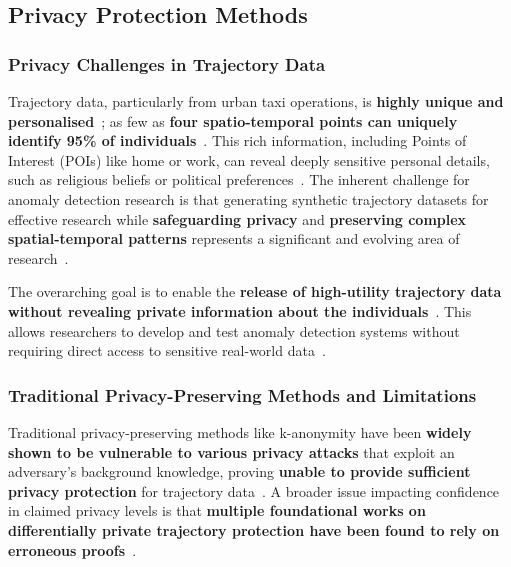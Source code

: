 \documentclass[runningheads]{llncs}
\begin{document}
\subsection{Privacy Protection Methods}
\label{sec:privacy-review}

\subsubsection{Privacy Challenges in Trajectory Data}

Trajectory data, particularly from urban taxi operations, is \textbf{highly unique and personalised}~\cite{Primault2019LongRoad,Buchholz2022RAoPT,Ma2021TrajectoryPrivacy}; as few as \textbf{four spatio-temporal points can uniquely identify 95\% of individuals}~\cite{Primault2019LongRoad,Buchholz2022RAoPT,Ma2021TrajectoryPrivacy}. This rich information, including Points of Interest (POIs) like home or work, can reveal deeply sensitive personal details, such as religious beliefs or political preferences~\cite{Primault2019LongRoad,Buchholz2022RAoPT}. The inherent challenge for anomaly detection research is that generating synthetic trajectory datasets for effective research while \textbf{safeguarding privacy} and \textbf{preserving complex spatial-temporal patterns} represents a significant and evolving area of research~\cite{Buchholz2024SoK,Buchholz2022RAoPT,Primault2019LongRoad,Naghizade2020PrivacyContextAware}.

The overarching goal is to enable the \textbf{release of high-utility trajectory data without revealing private information about the individuals}~\cite{Buchholz2024SoK,Rao2021LSTMTrajGAN,Liu2018TrajGANs,Jin2023SurveyExpStudy,Ma2021TrajectoryPrivacy,Naghizade2020PrivacyContextAware}. This allows researchers to develop and test anomaly detection systems without requiring direct access to sensitive real-world data~\cite{Buchholz2024SoK,Rao2021LSTMTrajGAN,Liu2018TrajGANs}.

\subsubsection{Traditional Privacy-Preserving Methods and Limitations}

Traditional privacy-preserving methods like k-anonymity have been \textbf{widely shown to be vulnerable to various privacy attacks} that exploit an adversary's background knowledge, proving \textbf{unable to provide sufficient privacy protection} for trajectory data~\cite{Chen2011DPTP,Buchholz2022RAoPT,Jin2023SurveyExpStudy}. A broader issue impacting confidence in claimed privacy levels is that \textbf{multiple foundational works on differentially private trajectory protection have been found to rely on erroneous proofs}~\cite{Buchholz2024SoK,Primault2014DPLPP,Errounda2019AnalysisDPLocation}.
\end{document}
